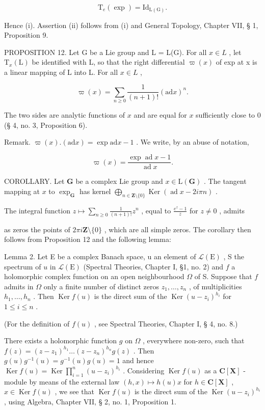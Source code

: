 \[
\mathrm{T} _ {e} (\exp) = \mathrm{Id} _ {\mathrm{L(G)}}.
\]

Hence (i). Assertion (ii) follows from (i) and General Topology, Chapter VII, § 1, Proposition 9.

PROPOSITION 12. Let G be a Lie group and L = L(G). For all \(x \in L\) , let \(\mathrm{T}_{x}(\mathrm{L})\) be identified with L, so that the right differential \(\varpi(x)\) of exp at x is a linear mapping of L into L. For all \(x \in L\) ,

\[
\varpi (x) = \sum_ {n \geqslant 0} \frac {1}{(n + 1) !} (\mathrm{ad} x) ^ {n}.
\]

The two sides are analytic functions of \(x\) and are equal for \(x\) sufficiently close to 0 (§ 4, no. 3, Proposition 6).

Remark. \(\varpi(x) . (\mathrm{ad} x) = \exp \mathrm{ad} x - 1\) . We write, by an abuse of notation,

\[
\varpi (x) = \frac {\exp \operatorname{ad} x - 1}{\operatorname{ad} x}.
\]

COROLLARY. Let \(\mathbf{G}\) be a complex Lie group and \(x \in \mathrm{L}(\mathbf{G})\) . The tangent mapping at \(x\) to \(\exp_{\mathbf{G}}\) has kernel \(\bigoplus_{n \in \mathbf{Z}\setminus\{0\}} \operatorname{Ker}(\operatorname{ad} x - 2i\pi n)\) .

The integral function \(z \mapsto \sum_{n \geqslant 0} \frac{1}{(n + 1)!} z^n\) , equal to \(\frac{e^z - 1}{z}\) for \(z \neq 0\) , admits

as zeros the points of \(2\pi i\mathbf{Z}\setminus\{0\}\) , which are all simple zeros. The corollary then follows from Proposition 12 and the following lemma:

Lemma 2. Let E be a complex Banach space, u an element of \(\mathcal{L}(\mathrm{E})\) , S the spectrum of \(u\) in \(\mathcal{L}(\mathrm{E})\) (Spectral Theories, Chapter I, §1, no. 2) and \(f\) a holomorphic complex function on an open neighbourhood \(\Omega\) of S. Suppose that \(f\) admits in \(\Omega\) only a finite number of distinct zeros \(z_{1},\ldots ,z_{n}\) , of multiplicities \(h_1,\dots,h_n\) . Then \(\operatorname {Ker}f(u)\) is the direct sum of the \(\operatorname {Ker}(u - z_i)^{h_i}\) for \(1\leqslant i\leqslant n\) .

(For the definition of \(f(u)\) , see Spectral Theories, Chapter I, § 4, no. 8.)

There exists a holomorphic function \(g\) on \(\Omega\) , everywhere non-zero, such that \(f(z) = (z - z_1)^{h_1} \ldots (z - z_n)^{h_n} g(z)\) . Then \(g(u)g^{-1}(u) = g^{-1}(u)g(u) = 1\) and hence \(\operatorname{Ker}f(u) = \operatorname{Ker}\prod_{i=1}^{n}(u - z_i)^{h_i}\) . Considering \(\operatorname{Ker}f(u)\) as a \(\mathbf{C}[\mathbf{X}]\) -module by means of the external law \((h,x)\mapsto h(u)x\) for \(h\in \mathbf{C}[\mathbf{X}]\) , \(x\in \operatorname{Ker}f(u)\) , we see that \(\operatorname{Ker} f(u)\) is the direct sum of the \(\operatorname{Ker}(u - z_i)^{h_i}\) , using Algebra, Chapter VII, § 2, no. 1, Proposition 1.

